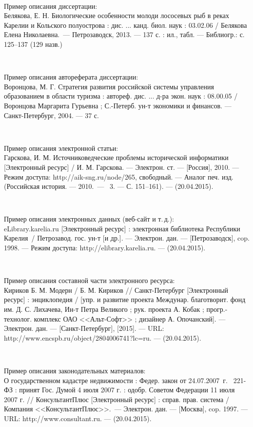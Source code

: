 \documentclass[utf8,14pt, coursreport]{G7-32}
\begin{document}
~

Пример описания диссертации:\\
Белякова, Е. Н. Биологические особенности молоди лососевых рыб в реках Карелии и Кольского полуострова : дис. ... канд. биол. наук : 03.02.06 / Белякова Елена Николаевна.~--- Петрозаводск, 2013. --- 137 с. : ил., табл. --- Библиогр.: с. 125--137 (129 назв.)

~

Пример описания автореферата диссертации:\\
Воронцова, М. Г. Стратегия развития российской системы управления образованием в области туризма : автореф. дис. ... д-ра экон. наук : 08.00.05 / Воронцова Маргарита Гурьевна ; С.-Петерб. ун-т экономики и финансов. --- Санкт-Петербург, 2004. --- 37 с.

~

Пример описания электронной статьи:\\
Гарскова, И. М. Источниковедческие проблемы исторической информатики [Электронный ресурс] / И. М. Гарскова. --- Электрон. ст. --- [Россия], 2010. --- Режим доступа: http://aik-sng.ru/node/265, свободный. --- Аналог печ. изд. (Российская история. --- 2010.~--- \No~3. --- С. 151--161). --- (20.04.2015). 

~

Пример описания электронных данных (веб-сайт и т.\,д.):\\
eLibrary.karelia.ru [Электронный ресурс] : электронная библиотека Республики 
Карелия~/ Петрозавод. гос. ун-т [и др.]. --- Электрон. дан. --- [Петрозаводск], cop. 1998. --- Режим дос\-тупа: http://elibrary.karelia.ru. --- (20.04.2015). 

~

Пример описания составной части электронного ресурса:\\
Кириков Б. М. Модерн / Б. М. Кириков // Санкт-Петербург [Электронный ресурс] : энциклопедия / [упр. и развитие проекта Междунар. благотворит. фонд им. Д. С. Лихачева, Ин-т Петра Великого ; рук. проекта А. Кобак ; прогр.-технолог. комплекс ОАО 
<<Альт-Софт>> ; дизайнер А. Опочанский]. --- Электрон. дан. --- [Санкт-Петербург], [2015]. --- URL: http://www.encspb.ru/object/2804006741?lc=ru. --- (20.04.2015).

~

Пример описания законодательных материалов:\\
О государственном кадастре недвижимости : Федер. закон от 24.07.2007~г. \No~221-ФЗ : принят Гос. Думой 4 июля 2007 г. : одобр. Советом Федерации 11 июля 2007 г. // КонсультантПлюс [Электронный ресурс] : справ. прав. система / Компания <<КонсультантПлюс>>.~--- Электрон.  дан. --- [Москва],  cop. 1997. --- URL: http://www.consultant.ru. --- (20.04.2015). 
\end{document}
